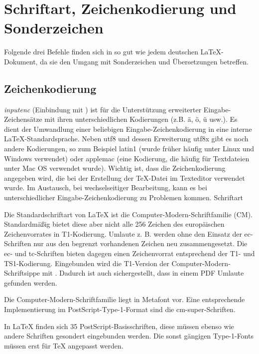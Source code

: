 
\section{Schriftart, Zeichenkodierung und Sonderzeichen}

Folgende drei Befehle finden sich in so gut wie jedem deutschen LaTeX-Dokument, da sie den Umgang mit Sonderzeichen und Übersetzungen betreffen.
\subsection{Zeichenkodierung}

\textit{inputenc} (Einbindung mit ) ist für die Unterstützung erweiterter Eingabe-Zeichensätze mit ihren unterschiedlichen Kodierungen (z.B. ä, ö, ü usw.). Es dient der Umwandlung einer beliebigen Eingabe-Zeichenkodierung in eine interne LaTeX-Standardsprache. Neben utf8 und dessen Erweiterung utf8x gibt es noch andere Kodierungen, so zum Beispiel latin1 (wurde früher häufig unter Linux und Windows verwendet) oder applemac (eine Kodierung, die häufig für Textdateien unter Mac OS verwendet wurde). Wichtig ist, dass die Zeichenkodierung angegeben wird, die bei der Erstellung der TeX-Datei im Texteditor verwendet wurde. Im Austausch, bei wechselseitiger Bearbeitung, kann es bei unterschiedlicher Eingabe-Zeichenkodierung zu Problemen kommen.\cite{Ensenbach}
Schriftart

Die Standardschriftart von LaTeX ist die Computer-Modern-Schriftfamilie (CM). Standardmäßig bietet diese aber nicht alle 256 Zeichen des europäischen Zeichenvorrates in T1-Kodierung. Umlaute z. B. werden ohne den Einsatz der ec-Schriften nur aus den begrenzt vorhandenen Zeichen neu zusammengesetzt. Die ec- und tc-Schriften bieten dagegen einen Zeichenvorrat entsprechend der T1- und TS1-Kodierung. Eingebunden wird die T1-Version der Computer-Modern-Schriftsippe mit . Dadurch ist auch sichergestellt, dass in einem PDF Umlaute gefunden werden.

Die Computer-Modern-Schriftfamilie liegt in Metafont vor. Eine entsprechende Implementierung im PostScript-Type-1-Format sind die cm-super-Schriften.

In LaTeX finden sich 35 PostScript-Basisschriften, diese müssen ebenso wie andere Schriften gesondert eingebunden werden. Die sonst gängigen Type-1-Fonts müssen erst für TeX angepasst werden.

